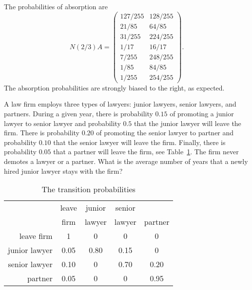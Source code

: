 \documentclass[12pt]{article}
\begin{document}
\begin{example}
    The probabilities of absorption are
    \[
        N(2/3) A =
        \begin{pmatrix}
            127/255 & 128/255\\
            21/85 & 64/85\\
            31/255 & 224/255\\
            1/17 & 16/17\\
            7/255 & 248/255\\
            1/85 & 84/85\\
            1/255 & 254/255
        \end{pmatrix}.
    \] The absorption probabilities are strongly biased to the right, as
    expected.
\end{example}

\begin{example}
    A law firm employs three types of lawyers:  junior lawyers, senior
    lawyers, and partners.  During a given year, there is probability \(
    0.15 \) of promoting a junior lawyer to senior lawyer and
    probability \( 0.5 \) that the junior lawyer will leave the firm.
    There is probability \( 0.20 \) of promoting the senior lawyer to
    partner and probability \( 0.10 \) that the senior lawyer will leave
    the firm.  Finally, there is probability \( 0.05 \) that a partner
    will leave the firm, see
    Table~\ref{tab:newwaitingtimeabsorption:lawyers}.  
    The firm never demotes a lawyer or a partner.
    What is the average number of years that a newly hired junior lawyer
    stays with the firm?

    \begin{table}[htbp]
        \caption[]{The transition probabilities }
        \vspace{4mm}
        \begin{tabular}[tb]
            {r|cccc} & leave & junior & senior & \\
            & firm & lawyer & lawyer & partner \\
            \hline
            leave firm & 1 & 0 & 0 & 0 \\
            junior lawyer & 0.05 & 0.80 & 0.15 & 0 \\
            senior lawyer & 0.10 & 0 & 0.70 & 0.20 \\
            partner & 0.05 & 0 & 0 & 0.95
        \end{tabular}
        \label{tab:newwaitingtimeabsorption:lawyers}
    \end{table}


\end{example}
\end{document}
